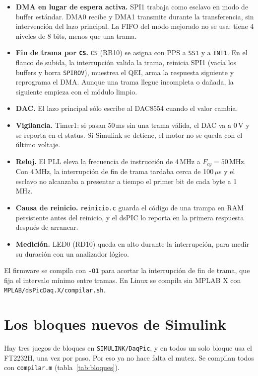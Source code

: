 \documentclass[11pt]{article}
\newcommand{\code}[1]{\texttt{#1}}
\newcommand{\us}{\,$\mu$s}
\begin{document}
\begin{itemize}
\item \textbf{DMA en lugar de espera activa.} SPI1 trabaja como esclavo en
  modo de buffer estándar. DMA0 recibe y DMA1 transmite durante la
  transferencia, sin intervención del lazo principal. La FIFO del modo mejorado
  no se usa: tiene 4 niveles de 8 bits, menos que una trama.
\item \textbf{Fin de trama por \code{CS}.} \code{CS} (RB10) se asigna con PPS a
  \code{SS1} y a \code{INT1}. En el flanco de subida, la interrupción valida la
  trama, reinicia SPI1 (vacía los buffers y borra \code{SPIROV}), muestrea el
  QEI, arma la respuesta siguiente y reprograma el DMA. Aunque una trama llegue
  incompleta o dañada, la siguiente empieza con el módulo limpio.
\item \textbf{DAC.} El lazo principal sólo escribe al DAC8554 cuando el valor
  cambia.
\item \textbf{Vigilancia.} Timer1: si pasan 50\,ms sin una trama válida, el DAC
  va a 0\,V y se reporta en el status. Si Simulink se detiene, el motor no se
  queda con el último voltaje.
\item \textbf{Reloj.} El PLL eleva la frecuencia de instrucción de 4\,MHz a
  $F_{cy} = 50$\,MHz. Con 4\,MHz, la interrupción de fin de trama tardaba cerca
  de 100\us{} y el esclavo no alcanzaba a presentar a tiempo el primer bit de
  cada byte a 1\,MHz.
\item \textbf{Causa de reinicio.} \code{reinicio.c} guarda el código de una
  trampa en RAM persistente antes del reinicio, y el dsPIC lo reporta en la
  primera respuesta después de arrancar.
\item \textbf{Medición.} LED0 (RD10) queda en alto durante la interrupción,
  para medir su duración con un analizador lógico.
\end{itemize}

El firmware se compila con \code{-O1} para acortar la interrupción de fin de
trama, que fija el intervalo mínimo entre tramas. En Linux se compila sin MPLAB
X con \code{MPLAB/dsPicDaq.X/compilar.sh}.

\section{Los bloques nuevos de Simulink}
\label{sec:bloques}

Hay tres juegos de bloques en \code{SIMULINK/DaqPic}, y en todos un solo bloque
usa el FT2232H, una vez por paso. Por eso ya no hace falta el mutex. Se
compilan todos con \code{compilar.m} (tabla~\ref{tab:bloques}).
\end{document}
